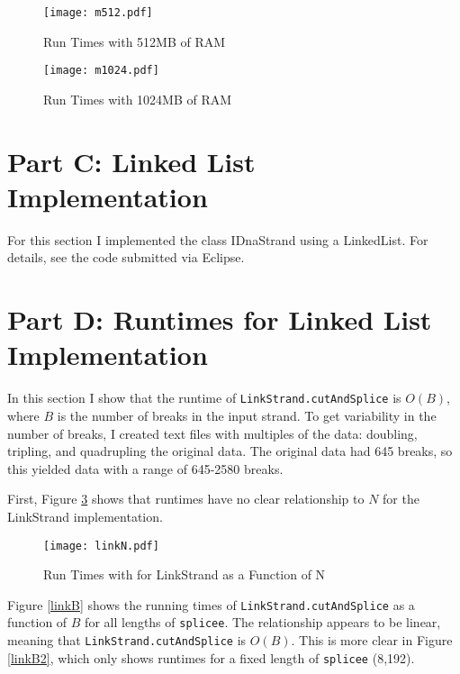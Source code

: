 \documentclass[12pt]{article}
\begin{document}
\begin{center}
\begin{figure}[h!]
\centering
\texttt{[image: m512.pdf]}
\caption{Run Times with 512MB of RAM}
\label{m512}
\end{figure}

\end{center}

\begin{center}
\begin{figure}[h!]
\centering
\texttt{[image: m1024.pdf]}
\caption{Run Times with 1024MB of RAM}
\label{m1024}
\end{figure}
\end{center}

\section*{Part C: Linked List Implementation}

For this section I implemented the class IDnaStrand using a LinkedList. For details, see the code submitted via Eclipse.

\section*{Part D: Runtimes for Linked List Implementation}

In this section I show that the runtime of \texttt{LinkStrand.cutAndSplice} is $O(B)$, where $B$ is the number of breaks in the input strand. To get variability in the number of breaks, I created text files with multiples of the  data: doubling, tripling, and quadrupling the original data. The original data had 645 breaks, so this yielded data with a range of 645-2580 breaks. 

First, Figure \ref{linkN} shows that runtimes have no clear relationship to $N$ for the LinkStrand implementation. 

\begin{center}
\begin{figure}[h!]
\centering
\texttt{[image: linkN.pdf]}
\caption{Run Times with for LinkStrand as a Function of N}
\label{linkN}
\end{figure}
\end{center}

Figure \ref{linkB} shows the running times of \texttt{LinkStrand.cutAndSplice} as a function of $B$ for all lengths of \texttt{splicee}. The relationship appears to be linear, meaning that \texttt{LinkStrand.cutAndSplice} is $O(B)$. This is more clear in Figure \ref{linkB2}, which only shows runtimes for a fixed length of \texttt{splicee} (8,192). 
\end{document}
